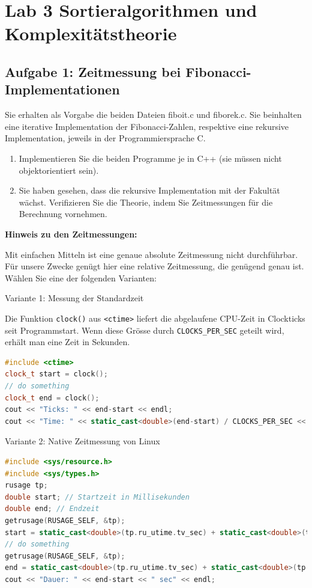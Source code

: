 \section{Lab 3 Sortieralgorithmen und Komplexitätstheorie}
\subsection{Aufgabe 1: Zeitmessung bei Fibonacci-Implementationen}
Sie erhalten als Vorgabe die beiden Dateien fiboit.c und fiborek.c. Sie beinhalten eine iterative Implementation
der Fibonacci-Zahlen, respektive eine rekursive Implementation, jeweils in der Programmiersprache
C.
\begin{enumerate}
  \item Implementieren Sie die beiden Programme je in C++ (sie müssen nicht objektorientiert sein).
  \item Sie haben gesehen, dass die rekursive Implementation mit der Fakultät wächst. Verifizieren Sie die Theorie, indem Sie Zeitmessungen für die Berechnung vornehmen.
\end{enumerate}

\textbf{Hinweis zu den Zeitmessungen:}

Mit einfachen Mitteln ist eine genaue absolute Zeitmessung nicht durchführbar. Für unsere Zwecke genügt
hier eine relative Zeitmessung, die genügend genau ist. Wählen Sie eine der folgenden Varianten:

Variante 1: Messung der Standardzeit

Die Funktion \texttt{clock()} aus \texttt{<ctime>} liefert die abgelaufene CPU-Zeit in Clockticks seit Programmstart. Wenn diese Grösse durch \texttt{CLOCKS\_PER\_SEC} geteilt wird, erhält man eine Zeit in Sekunden.
\begin{lstlisting}[language=C++, style=C++]
#include <ctime>
clock_t start = clock();
// do something
clock_t end = clock();
cout << "Ticks: " << end-start << endl;
cout << "Time: " << static_cast<double>(end-start) / CLOCKS_PER_SEC << " sec" << endl;
\end{lstlisting}

Variante 2: Native Zeitmessung von Linux
\begin{lstlisting}[language=C++, style=C++]
#include <sys/resource.h>
#include <sys/types.h>
rusage tp;
double start; // Startzeit in Millisekunden
double end; // Endzeit
getrusage(RUSAGE_SELF, &tp);
start = static_cast<double>(tp.ru_utime.tv_sec) + static_cast<double>(tp.ru_utime.tv_usec)/1E6;
// do something
getrusage(RUSAGE_SELF, &tp);
end = static_cast<double>(tp.ru_utime.tv_sec) + static_cast<double>(tp.ru_utime.tv_usec)/1E6;
cout << "Dauer: " << end-start << " sec" << endl;
\end{lstlisting}

